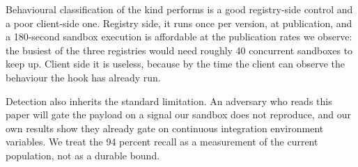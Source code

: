 Behavioural classification of the kind \tool{} performs is a good registry-side
control and a poor client-side one. Registry side, it runs once per version, at
publication, and a 180-second sandbox execution is affordable at the
publication rates we observe: the busiest of the three registries would need
roughly 40 concurrent sandboxes to keep up. Client side it is useless, because
by the time the client can observe the behaviour the hook has already run.

Detection also inherits the standard limitation. An adversary who reads this
paper will gate the payload on a signal our sandbox does not reproduce, and our
own results show they already gate on continuous integration environment
variables. We treat the 94 percent recall as a measurement of the current
population, not as a durable bound.
